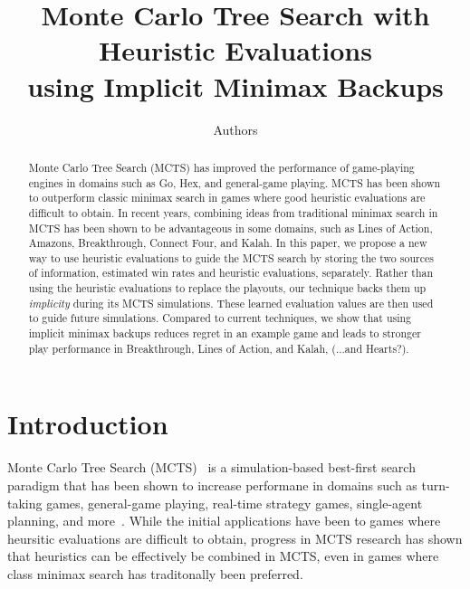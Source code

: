 \documentclass[letterpaper]{article}
\begin{document}
%
\title{Monte Carlo Tree Search with Heuristic Evaluations\\using Implicit Minimax Backups}
\author{Authors}

\maketitle

\begin{abstract}
Monte Carlo Tree Search (MCTS) has improved the performance of game-playing engines in 
domains such as Go, Hex, and general-game playing. MCTS has been shown to outperform 
classic minimax search in games where good heuristic evaluations are difficult to obtain. 
In recent years, combining 
ideas from traditional minimax search in MCTS has been shown to be advantageous in some domains,
such as Lines of Action, Amazons, Breakthrough, Connect Four, and Kalah. In this paper, we propose 
a new way to use heuristic evaluations to guide the MCTS search by storing the two sources of 
information, estimated win rates and heuristic evaluations, separately. 
Rather than using the heuristic evaluations to replace the playouts, 
our technique backs them up {\it implicity} during its MCTS simulations. 
These learned evaluation values are then used to guide future simulations. 
Compared to current techniques, we show that using implicit minimax backups  
reduces regret in an example game and leads to stronger 
play performance in Breakthrough, Lines of Action, and Kalah, (...and Hearts?).
\end{abstract}


\section{Introduction}

Monte Carlo Tree Search (MCTS)~\cite{Coulom06Efficient,Kocsis06Bandit} is a simulation-based best-first
search paradigm that has been shown to increase performane in domains such as turn-taking games, 
general-game playing, real-time strategy games, single-agent planning, and more~\cite{mctssurvey}. 
While the initial applications have been to games where heursitic evaluations are difficult to obtain, 
progress in MCTS research has shown that heuristics can be effectively be combined in MCTS, even in games 
where class minimax search has traditonally been preferred. 
\end{document}
